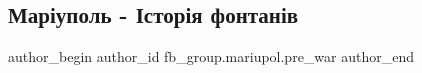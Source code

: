  
 
 
 
 

\subsection{Маріуполь - Історія фонтанів}
\label{sec:17_01_2023.fb.fb_group.mariupol.pre_war.2.mar_upol____stor_ya_}

\ifcmt
 author_begin
   author_id fb_group.mariupol.pre_war
 author_end
\fi
